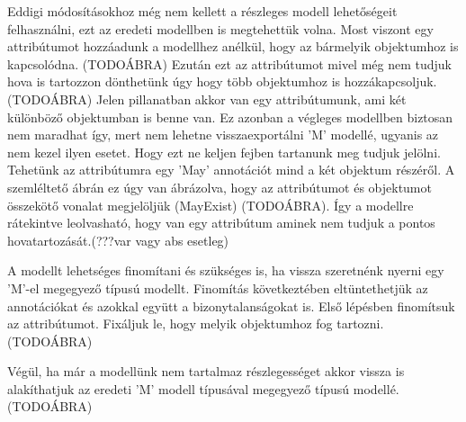 \par
Eddigi módosításokhoz még nem kellett a részleges modell lehetőségeit felhasználni, ezt az eredeti modellben is megtehettük volna. Most viszont egy attribútumot hozzáadunk a modellhez anélkül, hogy az bármelyik objektumhoz is kapcsolódna. (TODOÁBRA) Ezután ezt az attribútumot mivel még nem tudjuk  hova is tartozzon dönthetünk úgy hogy több objektumhoz is hozzákapcsoljuk. (TODOÁBRA)
Jelen pillanatban akkor van egy attribútumunk, ami két különböző objektumban is benne van. Ez azonban a végleges modellben biztosan nem maradhat így, mert nem lehetne visszaexportálni 'M' modellé, ugyanis az nem kezel ilyen esetet. Hogy ezt ne keljen fejben tartanunk meg tudjuk jelölni. Tehetünk az attribútumra egy 'May' annotációt mind a két objektum részéről. A szemléltető ábrán ez úgy van ábrázolva, hogy az attribútumot és objektumot összekötő vonalat megjelöljük (MayExist) (TODOÁBRA). Így a modellre rátekintve leolvasható, hogy van egy attribútum aminek nem tudjuk a pontos hovatartozását.(???var vagy abs esetleg)
\par
A modellt lehetséges finomítani és szükséges is, ha vissza szeretnénk nyerni egy 'M'-el megegyező típusú modellt. Finomítás következtében eltüntethetjük az annotációkat és azokkal együtt a bizonytalanságokat is. Első lépésben finomítsuk az attribútumot. Fixáljuk le, hogy melyik objektumhoz fog tartozni.(TODOÁBRA)
\par
Végül, ha már a modellünk nem tartalmaz részlegességet akkor vissza is alakíthatjuk az eredeti 'M' modell típusával megegyező típusú modellé.(TODOÁBRA)